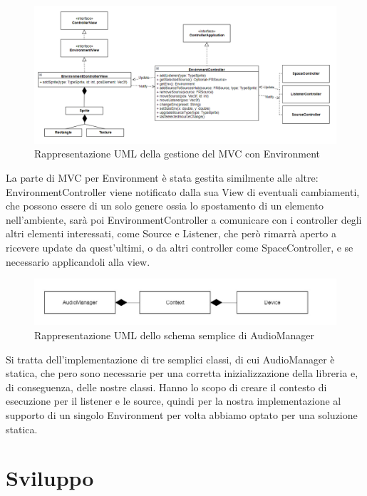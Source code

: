 \documentclass[a4paper,12pt]{report}
\begin{document}
%
\begin{figure}[H]
\centering{}
\includegraphics[width=\textwidth]{img/environment/EnvironmentMVC.png}
\caption{Rappresentazione UML della gestione del MVC con Environment}
\label{img:environmentmvc}
\end{figure}
La parte di MVC per Environment è stata gestita similmente alle altre: EnvironmentController viene notificato dalla sua View di eventuali cambiamenti, che possono essere di un solo genere ossia lo spostamento di un elemento nell'ambiente, sarà poi EnvironmentController a comunicare con i controller degli altri elementi interessati, come Source e Listener, che però rimarrà aperto a ricevere update da quest'ultimi, o da altri controller come SpaceController, e se necessario applicandoli alla view.
%
\begin{figure}[H]
\centering{}
\includegraphics[width=\textwidth]{img/environment/AudioManager.png}
\caption{Rappresentazione UML dello schema semplice di AudioManager}
\label{img:audiomanager}
\end{figure}
Si tratta dell'implementazione di tre semplici classi, di cui AudioManager è statica, che pero sono necessarie per una corretta inizializzazione della libreria e, di conseguenza, delle nostre classi. Hanno lo scopo di creare il contesto di esecuzione per il listener e le source, quindi per la nostra implementazione al supporto di un singolo Environment per volta abbiamo optato per una soluzione statica.
%
\chapter{Sviluppo}
\end{document}

